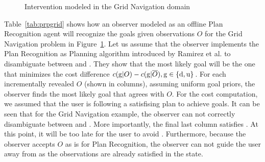 \begin{figure}[tpb]
         \vspace{-1em}
        \caption{Intervention modeled in the Grid Navigation domain}
        \vspace{-1em}
        \label{fig:single}
\end{figure}


Table~\ref{tab:prpgrid} shows how an observer modeled as an offline Plan Recognition agent will recognize the goals given observations $O$ for the Grid Navigation problem in Figure~\ref{fig:single}. Let us assume that the observer implements the Plan Recognition as Planning algorithm introduced by Ramirez et al. \citeyear{ramirez2010probabilistic} to disambiguate between \undesired and \desired. They show that the most likely goal will be the one that minimizes the cost difference $c(\mathrm{g}|O)-c(\mathrm{g}|\overline{O}), \mathrm{g}\in \lbrace\mathrm{d},\mathrm{u}\rbrace$. For each incrementally revealed $O$ (shown in columns), assuming uniform goal priors, the observer finds the most likely goal that agrees with $O$. For the cost computation, we assumed that the user is following a satisfising plan to achieve goals. 
It can be seen that for the Grid Navigation example, the observer can not correctly disambiguate between \desired and \undesired. 
More importantly, the final last column satisfies \undesired. At this point, it will be too late for the user to avoid \undesired.
Furthermore, because the observer accepts $O$ as is for Plan Recognition, the observer can not guide the user away from \undesired as the observations are already satisfied in the state.

